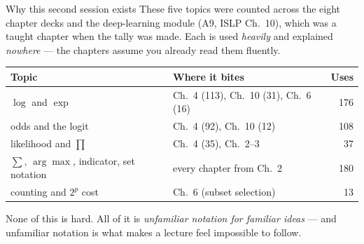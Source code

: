 \documentclass[aspectratio=169,11pt]{beamer}
\begin{document}
\begin{frame}{Why this second session exists}
  \footnotesize
  These five topics were counted across the eight chapter decks and the deep-learning
  module (A9, ISLP Ch.\ 10), which was a taught chapter when the tally was made. Each is used
  \emph{heavily} and explained \emph{nowhere} --- the chapters assume you
  already read them fluently.
  \begin{center}
  \begin{tabular}{@{}llr@{}}
    \toprule
    \textbf{Topic} & \textbf{Where it bites} & \textbf{Uses} \\
    \midrule
    $\log$ and $\exp$ & Ch.\ 4 (113), Ch.\ 10 (31), Ch.\ 6 (16) & 176 \\
    odds and the logit & Ch.\ 4 (92), Ch.\ 10 (12) & 108 \\
    likelihood and $\prod$ & Ch.\ 4 (35), Ch.\ 2--3 & 37 \\
    $\sum$, $\arg\max$, indicator, set notation & every chapter from Ch.\ 2 & 180 \\
    counting and $2^p$ cost & Ch.\ 6 (subset selection) & 13 \\
    \bottomrule
  \end{tabular}
  \end{center}
  \begin{takeaway}
    None of this is hard. All of it is \emph{unfamiliar notation for familiar
    ideas} --- and unfamiliar notation is what makes a lecture feel
    impossible to follow.
  \end{takeaway}
\end{frame}
\end{document}
